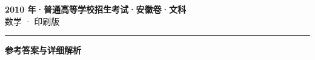 \documentclass[zihao=5, a4paper]{ctexart}
\begin{document}
\begin{center}
  {\Large\bfseries 2010 年·普通高等学校招生考试·安徽卷·文科}\\[4pt]
  {\large 数学 · 印刷版}
\end{center}
\medskip
{}

\par\bigskip\hrule\bigskip
{}
\begin{center}{\large\bfseries 参考答案与详细解析}\end{center}
\smallskip

\end{document}
